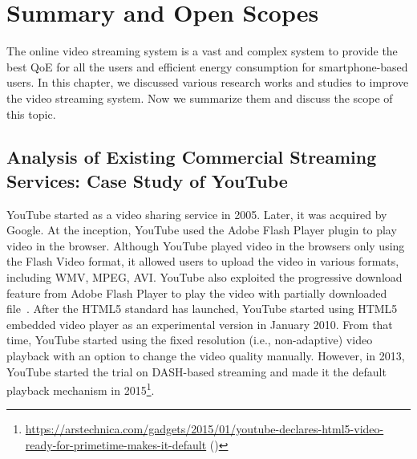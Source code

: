 \section{Summary and Open Scopes}
The online video streaming system is a vast and complex system to provide the best \ac{QoE} for all the users and efficient energy consumption for smartphone-based users. In this chapter, we discussed various research works and studies to improve the video streaming system. Now we summarize them and discuss the scope of this topic.

\subsection{Analysis of Existing Commercial Streaming Services: Case Study of YouTube}
YouTube started as a video sharing service in 2005. Later, it was acquired by Google. At the inception, YouTube used the Adobe Flash Player plugin to play video in the browser. Although YouTube played video in the browsers only using the Flash Video format, it allowed users to upload the video in various formats, including WMV, MPEG, AVI. YouTube also exploited the progressive download feature from Adobe Flash Player to play the video with partially downloaded file~\cite{gill2007youtube}. After the HTML5 standard has launched, YouTube started using \ac{HTML5} embedded video player as an experimental version in January 2010. From that time, YouTube started using the fixed resolution (i.e., non-adaptive) video playback with an option to change the video quality manually. However, in 2013, YouTube started the trial on \ac{DASH}-based streaming and made it the default playback mechanism in 2015\footnote{\url{https://arstechnica.com/gadgets/2015/01/youtube-declares-html5-video-ready-for-primetime-makes-it-default} (\lastaccessedtoday)}.

